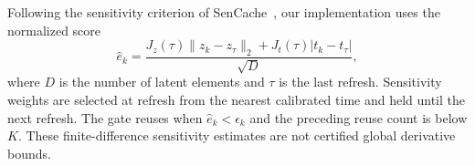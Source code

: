 \documentclass[10pt,twocolumn,letterpaper]{article}
\begin{document}
Following the sensitivity criterion of SenCache~\cite{haghighi2026sencache}, our implementation uses the normalized score
\begin{equation}
\widehat e_k=\frac{J_z(\tau)\|z_k-z_\tau\|_2+J_t(\tau)|t_k-t_\tau|}{\sqrt{D}},
\end{equation}
where $D$ is the number of latent elements and $\tau$ is the last refresh.
Sensitivity weights are selected at refresh from the nearest calibrated time and held until the next refresh.
The gate reuses when $\widehat e_k<\epsilon_k$ and the preceding reuse count is below $K$.
These finite-difference sensitivity estimates are not certified global derivative bounds.
\end{document}
